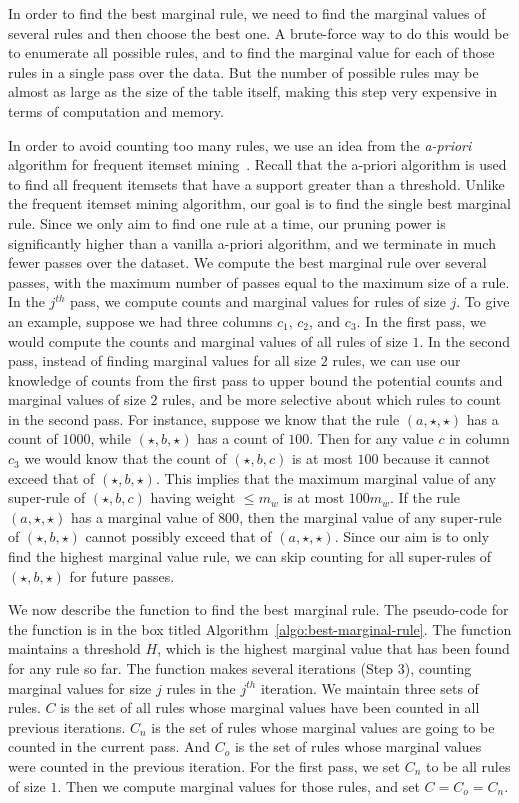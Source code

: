  In order to find the best marginal rule, we need to find the marginal values of several rules and then choose the best one. A brute-force way to do this would be to enumerate all possible rules, and to find the marginal value for each of those rules in a single pass over the data. But the number of possible rules may be almost as large as the size of the table itself, making this step very expensive in terms of computation and memory. 

In order to avoid counting too many rules, we use an idea from the {\em a-priori} algorithm for frequent itemset mining~\cite{apriori}. Recall that the a-priori algorithm is used to find all frequent itemsets that have a support greater than a threshold. Unlike the frequent itemset mining algorithm, our goal is to find the single best marginal rule. Since we only aim to find one rule at a time, our pruning power is significantly higher than a vanilla a-priori algorithm, and we terminate in much fewer passes over the dataset. 
We compute the best marginal rule over several passes, with the maximum number of passes equal to the maximum size of a rule. In the $j^{th}$ pass, we compute counts and marginal values for rules of size $j$. To give an example, suppose we had three columns $c_1$, $c_2$, and $c_3$. In the first pass, we would compute the counts and marginal values of all rules of size $1$. In the second pass, instead of finding marginal values for all size $2$ rules, we can use our knowledge of counts from the first pass to upper bound the potential counts and marginal values of size $2$ rules, and be more selective about which rules to count in the second pass. For instance, suppose we know that the rule $(a, \star, \star)$ has a count of $1000$, while $(\star, b, \star)$ has a count of $100$. Then for any value $c$ in column $c_3$ we would know that the count of $(\star, b, c)$ is at most $100$ because it cannot exceed that of $(\star, b, \star)$. This implies that the maximum marginal value of any super-rule of $(\star, b, c)$ having weight $\leq m_w$ is at most $100m_w$. If the rule $(a, \star, \star)$ has a marginal value of $800$, then the marginal value of any super-rule of $(\star, b, \star)$ cannot possibly exceed that of $(a, \star, \star)$. Since our aim is to only find the highest marginal value rule, we can skip counting for all super-rules of $(\star, b, \star)$ for future passes.

We now describe the function to find the best marginal rule. The pseudo-code for the function is in the box titled Algorithm~\ref{algo:best-marginal-rule}. The function maintains a threshold $H$, which is the highest marginal value that has been found for any rule so far. The function makes several iterations (Step $3$), counting marginal values for size $j$ rules in the $j^{th}$ iteration. We maintain three sets of rules. $C$ is the set of all rules whose marginal values have been counted in all previous iterations. $C_n$ is the set of rules whose marginal values are going to be counted in the current pass. And $C_o$ is the set of rules whose marginal values were counted in the previous iteration. For the first pass, we set $C_n$ to be all rules of size $1$. Then we compute marginal values for those rules, and set $C = C_o = C_n$.

